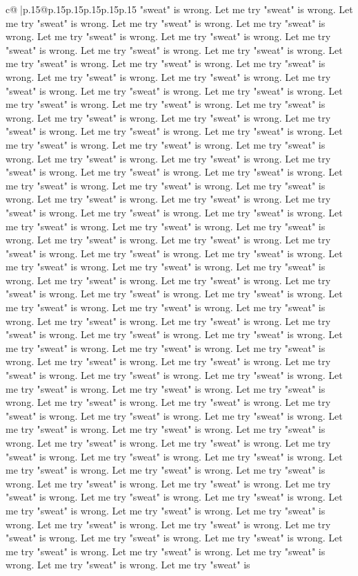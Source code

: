 \documentclass{article}
\begin{document}
{\begin{supertabular}{c@{$\;$}|p{.15\linewidth}@{}p{.15\linewidth}p{.15\linewidth}p{.15\linewidth}p{.15\linewidth}p{.15\linewidth}}
{{{"sweat" is wrong. Let me try "sweat" is wrong. Let me try "sweat" is wrong. Let me try "sweat" is wrong. Let me try "sweat" is wrong. Let me try "sweat" is wrong. Let me try "sweat" is wrong. Let me try "sweat" is wrong. Let me try "sweat" is wrong. Let me try "sweat" is wrong. Let me try "sweat" is wrong. Let me try "sweat" is wrong. Let me try "sweat" is wrong. Let me try "sweat" is wrong. Let me try "sweat" is wrong. Let me try "sweat" is wrong. Let me try "sweat" is wrong. Let me try "sweat" is wrong. Let me try "sweat" is wrong. Let me try "sweat" is wrong. Let me try "sweat" is wrong. Let me try "sweat" is wrong. Let me try "sweat" is wrong. Let me try "sweat" is wrong. Let me try "sweat" is wrong. Let me try "sweat" is wrong. Let me try "sweat" is wrong. Let me try "sweat" is wrong. Let me try "sweat" is wrong. Let me try "sweat" is wrong. Let me try "sweat" is wrong. Let me try "sweat" is wrong. Let me try "sweat" is wrong. Let me try "sweat" is wrong. Let me try "sweat" is wrong. Let me try "sweat" is wrong. Let me try "sweat" is wrong. Let me try "sweat" is wrong. Let me try "sweat" is wrong. Let me try "sweat" is wrong. Let me try "sweat" is wrong. Let me try "sweat" is wrong. Let me try "sweat" is wrong. Let me try "sweat" is wrong. Let me try "sweat" is wrong. Let me try "sweat" is wrong. Let me try "sweat" is wrong. Let me try "sweat" is wrong. Let me try "sweat" is wrong. Let me try "sweat" is wrong. Let me try "sweat" is wrong. Let me try "sweat" is wrong. Let me try "sweat" is wrong. Let me try "sweat" is wrong. Let me try "sweat" is wrong. Let me try "sweat" is wrong. Let me try "sweat" is wrong. Let me try "sweat" is wrong. Let me try "sweat" is wrong. Let me try "sweat" is wrong. Let me try "sweat" is wrong. Let me try "sweat" is wrong. Let me try "sweat" is wrong. Let me try "sweat" is wrong. Let me try "sweat" is wrong. Let me try "sweat" is wrong. Let me try "sweat" is wrong. Let me try "sweat" is wrong. Let me try "sweat" is wrong. Let me try "sweat" is wrong. Let me try "sweat" is wrong. Let me try "sweat" is wrong. Let me try "sweat" is wrong. Let me try "sweat" is wrong. Let me try "sweat" is wrong. Let me try "sweat" is wrong. Let me try "sweat" is wrong. Let me try "sweat" is wrong. Let me try "sweat" is wrong. Let me try "sweat" is wrong. Let me try "sweat" is wrong. Let me try "sweat" is wrong. Let me try "sweat" is wrong. Let me try "sweat" is wrong. Let me try "sweat" is wrong. Let me try "sweat" is wrong. Let me try "sweat" is wrong. Let me try "sweat" is wrong. Let me try "sweat" is wrong. Let me try "sweat" is wrong. Let me try "sweat" is wrong. Let me try "sweat" is wrong. Let me try "sweat" is wrong. Let me try "sweat" is wrong. Let me try "sweat" is wrong. Let me try "sweat" is wrong. Let me try "sweat" is wrong. Let me try "sweat" is wrong. Let me try "sweat" is wrong. Let me try "sweat" is wrong. Let me try "sweat" is wrong. Let me try "sweat" is wrong. Let me try "sweat" is wrong. Let me try "sweat" is wrong. Let me try "sweat" is wrong. Let me try "sweat" is wrong. Let me try "sweat" is wrong. Let me try "sweat" is wrong. Let me try "sweat" is wrong. Let me try "sweat" is wrong. Let me try "sweat" is }}}
\end{supertabular}}
\end{document}
